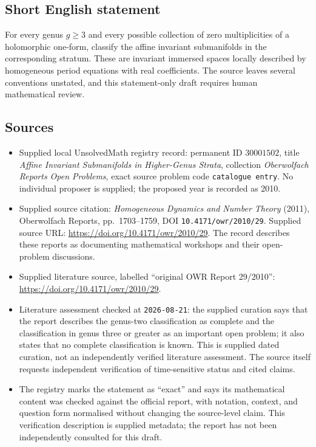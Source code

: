 \documentclass[11pt]{article}
\begin{document}
\subsection{Short English statement}
For every genus \(g\geq 3\) and every possible collection of zero multiplicities of a holomorphic one-form, classify the affine invariant submanifolds in the corresponding stratum. These are invariant immersed spaces locally described by homogeneous period equations with real coefficients. The source leaves several conventions unstated, and this statement-only draft requires human mathematical review.
\subsection{Sources}
\begin{itemize}
\item Supplied local UnsolvedMath registry record: permanent ID \(30001502\), title \emph{Affine Invariant Submanifolds in Higher-Genus Strata}, collection \emph{Oberwolfach Reports Open Problems}, exact source problem code \texttt{catalogue entry}. No individual proposer is supplied; the proposed year is recorded as 2010.
\item Supplied source citation: \emph{Homogeneous Dynamics and Number Theory} (2011), Oberwolfach Reports, pp.~1703--1759, DOI \texttt{10.4171/owr/2010/29}. Supplied source URL: \url{https://doi.org/10.4171/owr/2010/29}. The record describes these reports as documenting mathematical workshops and their open-problem discussions.
\item Supplied literature source, labelled ``original OWR Report 29/2010'': \url{https://doi.org/10.4171/owr/2010/29}.
\item Literature assessment checked at \texttt{2026-08-21}: the supplied curation says that the report describes the genus-two classification as complete and the classification in genus three or greater as an important open problem; it also states that no complete classification is known. This is supplied dated curation, not an independently verified literature assessment. The source itself requests independent verification of time-sensitive status and cited claims.
\item The registry marks the statement as ``exact'' and says its mathematical content was checked against the official report, with notation, context, and question form normalised without changing the source-level claim. This verification description is supplied metadata; the report has not been independently consulted for this draft.
\end{itemize}
\end{document}
